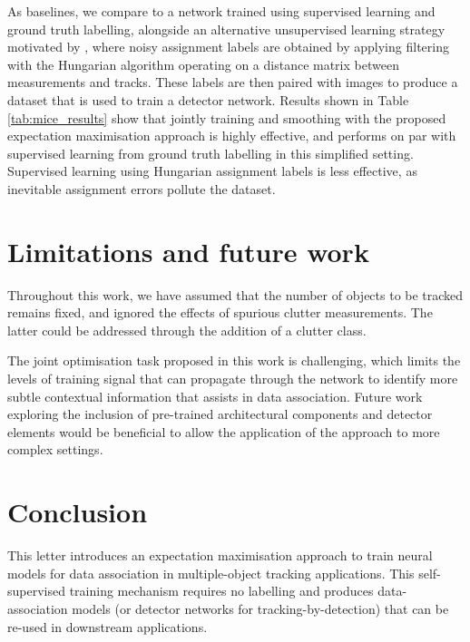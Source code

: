 \documentclass[journal]{IEEEtran}
\begin{document}
As baselines, we compare to a network trained using supervised learning and ground truth labelling, alongside an alternative unsupervised learning strategy motivated by \cite{karthik2020simple}, where noisy assignment labels are obtained by applying filtering with the Hungarian algorithm operating on a distance matrix between measurements and tracks. These labels are then paired with images to produce a dataset that is used to train a detector network. Results shown in Table \ref{tab:mice_results} show that jointly training and smoothing with the proposed expectation maximisation approach is highly effective, and performs on par with supervised learning from ground truth labelling in this simplified setting. Supervised learning using Hungarian assignment labels is less effective, as inevitable assignment errors pollute the dataset.

\section{Limitations and future work}

Throughout this work, we have assumed that the number of objects to be tracked remains fixed, and ignored the effects of spurious clutter measurements. The latter could be addressed through the addition of a clutter class.

The joint optimisation task proposed in this work is challenging, which limits the levels of training signal that can propagate through the network to identify more subtle contextual information that assists in data association. Future work exploring the inclusion of pre-trained architectural components and detector elements would be beneficial to allow the application of the approach to more complex settings.

\section{Conclusion}

This letter introduces an expectation maximisation approach to train neural models for data association in multiple-object tracking applications. This self-supervised training mechanism requires no labelling and produces data-association models (or  detector networks for tracking-by-detection) that can be re-used in downstream applications.



\end{document}
